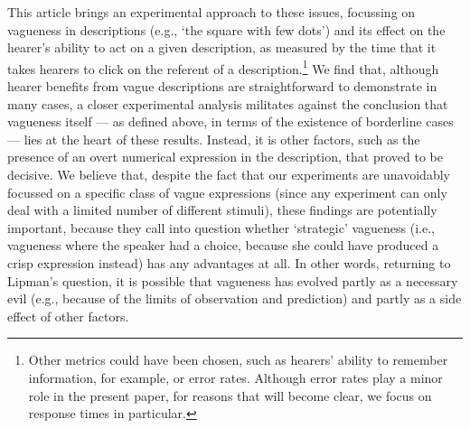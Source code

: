 \documentclass[ %
  graybox       %
 ,envcountchap  %
 ,sectrefs      %
]{svmono}
\begin{document}
This article brings an experimental approach to these issues, focussing on vagueness in descriptions (e.g., `the square with few dots') and its effect on the hearer's ability to act on a given description, as measured by the time that it takes hearers to click on the referent of a description.\footnote{Other metrics could have been chosen, such as hearers' ability to remember information, for example, or error rates. Although error rates play a minor role in the present paper, for reasons that will become clear, we focus on response times in particular.}
We find that, although hearer benefits from vague descriptions are straightforward to demonstrate in many cases, a closer experimental analysis militates against the conclusion that vagueness itself --- as defined above, in terms of the existence of borderline cases --- lies at the heart of these results.
Instead, it is other factors, such as the presence of an overt numerical expression in the description, that proved to be decisive.
We believe that, despite the fact that our experiments are unavoidably focussed on a specific class of vague expressions (since any experiment can only deal with a limited number of different stimuli), these findings are potentially important, because they call into question whether `strategic' vagueness (i.e., vagueness where the speaker had a choice, because she could have produced a crisp expression instead) has any advantages at all.
In other words, returning to Lipman's question, it is possible that vagueness has evolved partly as a necessary evil (e.g., because of the limits of observation and prediction) and partly as a side effect of other factors.
\end{document}
